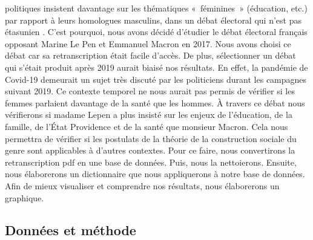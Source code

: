 \documentclass[
  letterpaper,
  DIV=11,
  numbers=noendperiod]{scrartcl}
\begin{document}
politiques insistent davantage sur les thématiques «~féminines~»
(éducation, etc.) par rapport à leurs homologues masculins, dans un
débat électoral qui n'est pas étasunien . C'est pourquoi, nous avons
décidé d'étudier le débat électoral français opposant Marine Le Pen et
Emmanuel Macron en 2017. Nous avons choisi ce débat car sa
retranscription était facile d'accès. De plus, sélectionner un débat qui
s'était produit après 2019 aurait biaisé nos résultats. En effet, la
pandémie de Covid-19 demeurait un sujet très discuté par les politiciens
durant les campagnes suivant 2019. Ce contexte temporel ne nous aurait
pas permis de vérifier si les femmes parlaient davantage de la santé que
les hommes. À travers ce débat nous vérifierons si madame Lepen a plus
insisté sur les enjeux de l'éducation, de la famille, de l'État
Providence et de la santé que monsieur Macron. Cela nous permettra de
vérifier si les postulats de la théorie de la construction sociale du
genre sont applicables à d'autres contextes. Pour ce faire, nous
convertirons la retranscription pdf en une base de données. Puis, nous
la nettoierons. Ensuite, nous élaborerons un dictionnaire que nous
appliquerons à notre base de données. Afin de mieux visualiser et
comprendre nos résultats, nous élaborerons un graphique.~

\hypertarget{donnuxe9es-et-muxe9thode}{%
\subsection{Données et méthode}\label{donnuxe9es-et-muxe9thode}}
\end{document}
